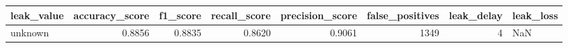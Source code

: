 \begin{tabular}{lrrrrrrl}
\toprule
leak\_value & accuracy\_score & f1\_score & recall\_score & precision\_score & false\_positives & leak\_delay & leak\_loss \\
\midrule
unknown & 0.8856 & 0.8835 & 0.8620 & 0.9061 & 1349 & 4 & NaN \\
\bottomrule
\end{tabular}
